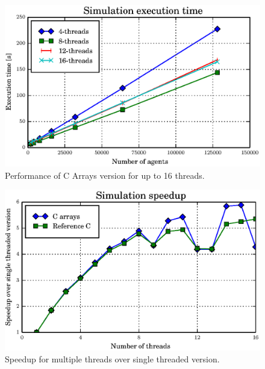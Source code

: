 \documentclass[12pt, a4paper]{report}
\begin{document}
\begin{figure}[H]
  \begin{center}
    \includegraphics[width=\columnwidth]{graphs/dict-array-multi-16-perf.eps}
    \caption{Performance of C Arrays version for up to 16 threads.}
    \label{fig:dict-array-multi-16-perf}
  \end{center}
\end{figure}

\begin{figure}[H]
  \begin{center}
    \includegraphics[width=\columnwidth]{graphs/speedup.eps}
    \caption{Speedup for multiple threads over single threaded version.}
    \label{fig:speedup}
  \end{center}
\end{figure}
\end{document}
